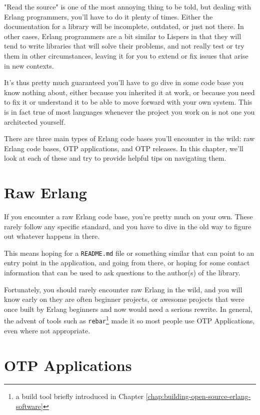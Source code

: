 \documentclass[11pt, oneside]{book}   	%
\newcommand{\filename}[1]{\Verb`#1`}
\newcommand{\app}[1]{\Verb`#1`}
\begin{document}
"Read the source" is one of the most annoying thing to be told, but dealing with Erlang programmers, you'll have to do it plenty of times. Either the documentation for a library will be incomplete, outdated, or just not there. In other cases, Erlang programmers are a bit similar to Lispers in that they will tend to write libraries that will solve their problems, and not really test or try them in other circumstances, leaving it for you to extend or fix issues that arise in new contexts.

It's thus pretty much guaranteed you'll have to go dive in some code base you know nothing about, either because you inherited it at work, or because you need to fix it or understand it to be able to move forward with your own system. This is in fact true of most languages whenever the project you work on is not one you architected yourself.

There are three main types of Erlang code bases you'll encounter in the wild: raw Erlang code bases, OTP applications, and OTP releases. In this chapter, we'll look at each of these and try to provide helpful tips on navigating them.

\section{Raw Erlang}
\label{sec:dive-raw-erlang}

If you encounter a raw Erlang code base, you're pretty much on your own. These rarely follow any specific standard, and you have to dive in the old way to figure out whatever happens in there.

This means hoping for a \filename{README.md} file or something similar that can point to an entry point in the application, and going from there, or hoping for some contact information that can be used to ask questions to the author(s) of the library.

Fortunately, you should rarely encounter raw Erlang in the wild, and you will know early on they are often beginner projects, or awesome projects that were once built by Erlang beginners and now would need a serious rewrite. In general, the advent of tools such as \app{rebar}\footnote{a build tool briefly introduced in Chapter \ref{chap:building-open-source-erlang-software}} made it so most people use OTP Applications, even where not appropriate.

\section{OTP Applications}
\label{sec:dive-otp-applications}
\end{document}
